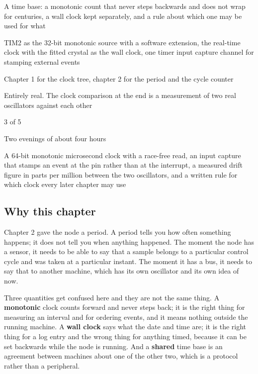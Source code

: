 
\begin{keyfacts}
\item[Adds to the node] A time base: a monotonic count that never steps backwards and does not wrap for centuries, a wall clock kept separately, and a rule about which one may be used for what
\item[Peripherals] TIM2 as the 32-bit monotonic source with a software extension, the real-time clock with the fitted crystal as the wall clock, one timer input capture channel for stamping external events
\item[Depends on] Chapter 1 for the clock tree, chapter 2 for the period and the cycle counter
\item[Real or modelled] Entirely real. The clock comparison at the end is a measurement of two real oscillators against each other
\item[Difficulty] 3 of 5
\item[Effort] Two evenings of about four hours
\item[Deliverable] A 64-bit monotonic microsecond clock with a race-free read, an input capture that stamps an event at the pin rather than at the interrupt, a measured drift figure in parts per million between the two oscillators, and a written rule for which clock every later chapter may use
\end{keyfacts}

\subsection*{Why this chapter}

Chapter 2 gave the node a period. A period tells you how often something
happens; it does not tell you when anything happened. The moment the node has a
sensor, it needs to be able to say that a sample belongs to a particular control
cycle and was taken at a particular instant. The moment it has a bus, it needs
to say that to another machine, which has its own oscillator and its own idea of
now.

Three quantities get confused here and they are not the same thing. A
\textbf{monotonic} clock counts forward and never steps back; it is the right
thing for measuring an interval and for ordering events, and it means nothing
outside the running machine. A \textbf{wall clock} says what the date and time
are; it is the right thing for a log entry and the wrong thing for anything
timed, because it can be set backwards while the node is running. And a
\textbf{shared} time base is an agreement between machines about one of the
other two, which is a protocol rather than a peripheral.

